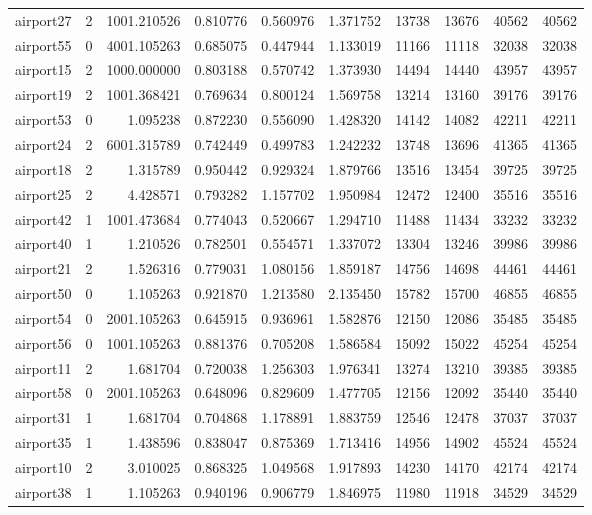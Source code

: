 \begin{longtable}{|l|r|r|r|r|r|r|r|r|r|}
airport27 & 2 & 1001.210526 & 0.810776 & 0.560976 & 1.371752 & 13738 & 13676 & 40562 & 40562 \\
airport55 & 0 & 4001.105263 & 0.685075 & 0.447944 & 1.133019 & 11166 & 11118 & 32038 & 32038 \\
airport15 & 2 & 1000.000000 & 0.803188 & 0.570742 & 1.373930 & 14494 & 14440 & 43957 & 43957 \\
airport19 & 2 & 1001.368421 & 0.769634 & 0.800124 & 1.569758 & 13214 & 13160 & 39176 & 39176 \\
airport53 & 0 & 1.095238 & 0.872230 & 0.556090 & 1.428320 & 14142 & 14082 & 42211 & 42211 \\
airport24 & 2 & 6001.315789 & 0.742449 & 0.499783 & 1.242232 & 13748 & 13696 & 41365 & 41365 \\
airport18 & 2 & 1.315789 & 0.950442 & 0.929324 & 1.879766 & 13516 & 13454 & 39725 & 39725 \\
airport25 & 2 & 4.428571 & 0.793282 & 1.157702 & 1.950984 & 12472 & 12400 & 35516 & 35516 \\
airport42 & 1 & 1001.473684 & 0.774043 & 0.520667 & 1.294710 & 11488 & 11434 & 33232 & 33232 \\
airport40 & 1 & 1.210526 & 0.782501 & 0.554571 & 1.337072 & 13304 & 13246 & 39986 & 39986 \\
airport21 & 2 & 1.526316 & 0.779031 & 1.080156 & 1.859187 & 14756 & 14698 & 44461 & 44461 \\
airport50 & 0 & 1.105263 & 0.921870 & 1.213580 & 2.135450 & 15782 & 15700 & 46855 & 46855 \\
airport54 & 0 & 2001.105263 & 0.645915 & 0.936961 & 1.582876 & 12150 & 12086 & 35485 & 35485 \\
airport56 & 0 & 1001.105263 & 0.881376 & 0.705208 & 1.586584 & 15092 & 15022 & 45254 & 45254 \\
airport11 & 2 & 1.681704 & 0.720038 & 1.256303 & 1.976341 & 13274 & 13210 & 39385 & 39385 \\
airport58 & 0 & 2001.105263 & 0.648096 & 0.829609 & 1.477705 & 12156 & 12092 & 35440 & 35440 \\
airport31 & 1 & 1.681704 & 0.704868 & 1.178891 & 1.883759 & 12546 & 12478 & 37037 & 37037 \\
airport35 & 1 & 1.438596 & 0.838047 & 0.875369 & 1.713416 & 14956 & 14902 & 45524 & 45524 \\
airport10 & 2 & 3.010025 & 0.868325 & 1.049568 & 1.917893 & 14230 & 14170 & 42174 & 42174 \\
airport38 & 1 & 1.105263 & 0.940196 & 0.906779 & 1.846975 & 11980 & 11918 & 34529 & 34529 \\

\end{longtable}
